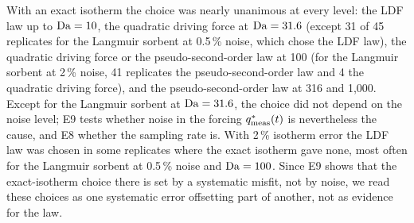 With an exact isotherm the choice was nearly unanimous at every level: the LDF law up to
$\mathrm{Da} = 10$, the quadratic driving force at $\mathrm{Da} = 31.6$ (except 31 of 45 replicates for the
Langmuir sorbent at 0.5\,\% noise, which chose the LDF law), the quadratic driving force or the
pseudo-second-order law at 100 (for the Langmuir sorbent at 2\,\% noise, 41 replicates the
pseudo-second-order law and 4 the quadratic driving force), and the pseudo-second-order law at 316
and 1,000. Except for the Langmuir sorbent at
$\mathrm{Da} = 31.6$, the choice did not depend on the noise level; E9 tests whether noise in the forcing
$q^{*}_{\mathrm{meas}}(t)$ is nevertheless the cause, and E8 whether the sampling rate is. With 2\,\% isotherm
error the LDF law was chosen in some replicates where the exact isotherm gave none, most often
for the Langmuir sorbent at 0.5\,\% noise and $\mathrm{Da} = 100$. Since E9 shows that the exact-isotherm
choice there is set by a systematic misfit, not by noise, we read these choices as one systematic
error offsetting part of another, not as evidence for the law.

